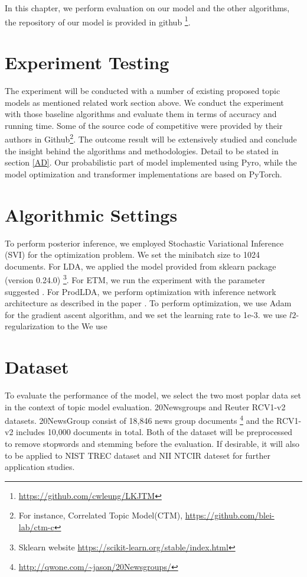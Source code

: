 In this chapter, we perform evaluation on our model and the other algorithms, the repository of our model is provided in github \footnote{\url{https://github.com/cwleung/LKJTM}}.
\section{Experiment Testing}
The experiment will be conducted with a number of existing proposed topic models as mentioned related work section above. We conduct the experiment with those baseline algorithms and evaluate them in terms of accuracy and running time. Some of the source code of competitive were provided by their authors in Github\footnote{For instance, Correlated Topic Model(CTM), \href{https://github.com/blei-lab/ctm-c}{https://github.com/blei-lab/ctm-c}}. The outcome result will be extensively studied and conclude the insight behind the algorithms and methodologies. Detail to be stated in section \ref{AD}. Our probabilistic part of model implemented using Pyro\cite{bingham_pyro_2019}, while the model optimization and transformer implementations are based on PyTorch\cite{paszke_automatic_2017}.
\section{Algorithmic Settings}
To perform posterior inference, we employed Stochastic Variational Inference (SVI) \cite{hoffman_stochastic_2013} for the optimization problem. We set the minibatch size to 1024 documents.
For LDA, we applied the model provided from sklearn package (version 0.24.0) \footnote{Sklearn website \url{https://scikit-learn.org/stable/index.html}}. For ETM, we run the experiment with the parameter suggested \cite{dieng_topic_2019}. For ProdLDA, we perform optimization with inference network architecture as described in the paper \cite{srivastava_autoencoding_2017}. 
To perform optimization, we use Adam for the gradient ascent algorithm, and we set the learning rate to 1e-3.
we use $ l2 $-regularization to the 
We use 

% 
\section{Dataset}To evaluate the performance of the model, we select the two most poplar data set in the context of topic model evaluation. 20Newsgroups and Reuter RCV1-v2 datasets. 20NewsGroup consist of 18,846 news group documents \footnote{\url{http://qwone.com/~jason/20Newsgroups/}} and the RCV1-v2 includes 10,000 documents in total. Both of the dataset will be preprocessed to remove stopwords and stemming before the evaluation. If desirable, it will also to be applied to NIST TREC dataset and NII NTCIR dateset for further application studies.
